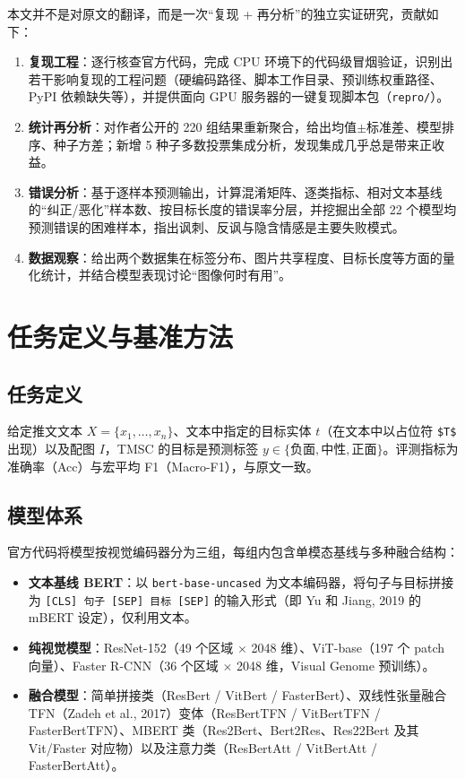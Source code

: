 \documentclass[11pt]{ctexart}
\begin{document}
本文并不是对原文的翻译，而是一次“复现 + 再分析”的独立实证研究，贡献如下：
\begin{enumerate}
  \item \textbf{复现工程}：逐行核查官方代码，完成 CPU 环境下的代码级冒烟验证，识别出若干影响复现的工程问题（硬编码路径、脚本工作目录、预训练权重路径、PyPI 依赖缺失等），并提供面向 GPU 服务器的一键复现脚本包（\texttt{repro/}）。
  \item \textbf{统计再分析}：对作者公开的 220 组结果重新聚合，给出均值$\pm$标准差、模型排序、种子方差；新增 5 种子多数投票集成分析，发现集成几乎总是带来正收益。
  \item \textbf{错误分析}：基于逐样本预测输出，计算混淆矩阵、逐类指标、相对文本基线的“纠正/恶化”样本数、按目标长度的错误率分层，并挖掘出全部 22 个模型均预测错误的困难样本，指出讽刺、反讽与隐含情感是主要失败模式。
  \item \textbf{数据观察}：给出两个数据集在标签分布、图片共享程度、目标长度等方面的量化统计，并结合模型表现讨论“图像何时有用”。
\end{enumerate}

\section{任务定义与基准方法}

\subsection{任务定义}

给定推文文本 $X=\{x_1,\ldots,x_n\}$、文本中指定的目标实体 $t$（在文本中以占位符 \texttt{\$T\$} 出现）以及配图 $I$，TMSC 的目标是预测标签 $y\in\{\text{负面},\text{中性},\text{正面}\}$。评测指标为准确率（Acc）与宏平均 F1（Macro-F1），与原文一致。

\subsection{模型体系}

官方代码将模型按视觉编码器分为三组，每组内包含单模态基线与多种融合结构：
\begin{itemize}
  \item \textbf{文本基线 BERT}：以 \texttt{bert-base-uncased} 为文本编码器，将句子与目标拼接为 \texttt{[CLS] 句子 [SEP] 目标 [SEP]} 的输入形式（即 Yu 和 Jiang, 2019 的 mBERT 设定），仅利用文本。
  \item \textbf{纯视觉模型}：ResNet-152（49 个区域 $\times$ 2048 维）、ViT-base（197 个 patch 向量）、Faster R-CNN（36 个区域 $\times$ 2048 维，Visual Genome 预训练）。
  \item \textbf{融合模型}：简单拼接类（ResBert / VitBert / FasterBert）、双线性张量融合 TFN（Zadeh et al., 2017）变体（ResBertTFN / VitBertTFN / FasterBertTFN）、MBERT 类（Res2Bert、Bert2Res、Res22Bert 及其 Vit/Faster 对应物）以及注意力类（ResBertAtt / VitBertAtt / FasterBertAtt）。
\end{itemize}
\end{document}
